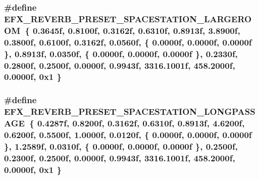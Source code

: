 \subsubsection[{\texorpdfstring{E\+F\+X\+\_\+\+R\+E\+V\+E\+R\+B\+\_\+\+P\+R\+E\+S\+E\+T\+\_\+\+S\+P\+A\+C\+E\+S\+T\+A\+T\+I\+O\+N\+\_\+\+L\+A\+R\+G\+E\+R\+O\+OM}{EFX_REVERB_PRESET_SPACESTATION_LARGEROOM}}]{\setlength{\rightskip}{0pt plus 5cm}\#define E\+F\+X\+\_\+\+R\+E\+V\+E\+R\+B\+\_\+\+P\+R\+E\+S\+E\+T\+\_\+\+S\+P\+A\+C\+E\+S\+T\+A\+T\+I\+O\+N\+\_\+\+L\+A\+R\+G\+E\+R\+O\+OM~\{ 0.\+3645f, 0.\+8100f, 0.\+3162f, 0.\+6310f, 0.\+8913f, 3.\+8900f, 0.\+3800f, 0.\+6100f, 0.\+3162f, 0.\+0560f, \{ 0.\+0000f, 0.\+0000f, 0.\+0000f \}, 0.\+8913f, 0.\+0350f, \{ 0.\+0000f, 0.\+0000f, 0.\+0000f \}, 0.\+2330f, 0.\+2800f, 0.\+2500f, 0.\+0000f, 0.\+9943f, 3316.\+1001f, 458.\+2000f, 0.\+0000f, 0x1 \}}\hypertarget{efx-presets_8h_a2fc89101c08d137174083f3db35a890d}{}\label{efx-presets_8h_a2fc89101c08d137174083f3db35a890d}
\subsubsection[{\texorpdfstring{E\+F\+X\+\_\+\+R\+E\+V\+E\+R\+B\+\_\+\+P\+R\+E\+S\+E\+T\+\_\+\+S\+P\+A\+C\+E\+S\+T\+A\+T\+I\+O\+N\+\_\+\+L\+O\+N\+G\+P\+A\+S\+S\+A\+GE}{EFX_REVERB_PRESET_SPACESTATION_LONGPASSAGE}}]{\setlength{\rightskip}{0pt plus 5cm}\#define E\+F\+X\+\_\+\+R\+E\+V\+E\+R\+B\+\_\+\+P\+R\+E\+S\+E\+T\+\_\+\+S\+P\+A\+C\+E\+S\+T\+A\+T\+I\+O\+N\+\_\+\+L\+O\+N\+G\+P\+A\+S\+S\+A\+GE~\{ 0.\+4287f, 0.\+8200f, 0.\+3162f, 0.\+6310f, 0.\+8913f, 4.\+6200f, 0.\+6200f, 0.\+5500f, 1.\+0000f, 0.\+0120f, \{ 0.\+0000f, 0.\+0000f, 0.\+0000f \}, 1.\+2589f, 0.\+0310f, \{ 0.\+0000f, 0.\+0000f, 0.\+0000f \}, 0.\+2500f, 0.\+2300f, 0.\+2500f, 0.\+0000f, 0.\+9943f, 3316.\+1001f, 458.\+2000f, 0.\+0000f, 0x1 \}}\hypertarget{efx-presets_8h_a8959825c810876082f20684cc9e7203a}{}\label{efx-presets_8h_a8959825c810876082f20684cc9e7203a}
